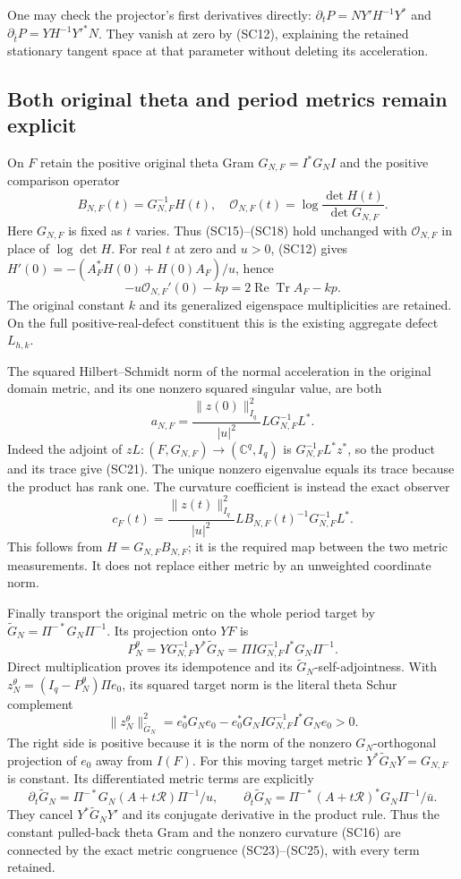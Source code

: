 \documentclass{article}
\begin{document}
One may check the projector's first derivatives directly:
$\partial_tP=NY'H^{-1}Y^*$ and
$\partial_{\bar t}P=YH^{-1}Y'^*N$.
They vanish at zero by (SC12), explaining the retained stationary
tangent space at that parameter without deleting its acceleration.

\subsection{Both original theta and period metrics remain explicit}

On $F$ retain the positive original theta Gram
$G_{N,F}=I^*G_NI$ and the positive comparison operator
\[
 B_{N,F}(t)=G_{N,F}^{-1}H(t),\quad
 \mathcal O_{N,F}(t)=\log\frac{\det H(t)}{\det G_{N,F}}.
 \tag{SC19}
\]
Here $G_{N,F}$ is fixed as $t$ varies.  Thus (SC15)--(SC18) hold
unchanged with $\mathcal O_{N,F}$ in place of $\log\det H$.
For real $t$ at zero and $u>0$, (SC12) gives
$H'(0)=-(A_F^*H(0)+H(0)A_F)/u$, hence
\[
 -u\mathcal O_{N,F}'(0)-kp
   =2\operatorname{Re}\operatorname{Tr}A_F-kp.
 \tag{SC20}
\]
The original constant $k$ and its generalized eigenspace multiplicities
are retained.  On the full positive-real-defect constituent this is
the existing aggregate defect $L_{h,k}$.

The squared Hilbert--Schmidt norm of the normal acceleration in the
original domain metric, and its one nonzero squared singular value,
are both
\[
 a_{N,F}=\frac{\|z(0)\|_{I_q}^2}{|u|^2}
              L G_{N,F}^{-1}L^*.
 \tag{SC21}
\]
Indeed the adjoint of $zL:(F,G_{N,F})\to(\mathbb C^q,I_q)$ is
$G_{N,F}^{-1}L^*z^*$, so the product and its trace give (SC21).
The unique nonzero eigenvalue equals its trace because the product
has rank one.  The curvature coefficient is instead the exact observer
\[
 c_F(t)=\frac{\|z(t)\|_{I_q}^2}{|u|^2}
       L B_{N,F}(t)^{-1}G_{N,F}^{-1}L^*.
 \tag{SC22}
\]
This follows from $H=G_{N,F}B_{N,F}$; it is the required map
between the two metric measurements.  It does not replace either
metric by an unweighted coordinate norm.

Finally transport the original metric on the whole period target by
$\widetilde G_N=\Pi^{-*}G_N\Pi^{-1}$.  Its projection onto $YF$ is
\[
 P_N^\theta
   =Y G_{N,F}^{-1}Y^*\widetilde G_N
   =\Pi I G_{N,F}^{-1}I^*G_N\Pi^{-1}.
 \tag{SC23}
\]
Direct multiplication proves its idempotence and its
$\widetilde G_N$-self-adjointness.  With
$z_N^\theta=(I_q-P_N^\theta)\Pi e_0$, its squared target norm is
the literal theta Schur complement
\[
 \|z_N^\theta\|_{\widetilde G_N}^2
   =e_0^*G_Ne_0-e_0^*G_NI G_{N,F}^{-1}I^*G_Ne_0>0.
 \tag{SC24}
\]
The right side is positive because it is the norm of the nonzero
$G_N$-orthogonal projection of $e_0$ away from $I(F)$.
For this moving target metric $Y^*\widetilde G_NY=G_{N,F}$ is
constant.  Its differentiated metric terms are explicitly
\[
 \partial_t\widetilde G_N
       =\Pi^{-*}G_N(A+t\mathcal R)\Pi^{-1}/u,
 \qquad
 \partial_{\bar t}\widetilde G_N
       =\Pi^{-*}(A+t\mathcal R)^*G_N\Pi^{-1}/\bar u.
 \tag{SC25}
\]
They cancel $Y^*\widetilde G_NY'$ and its conjugate derivative in
the product rule.  Thus the constant pulled-back theta Gram and the
nonzero curvature (SC16) are connected by the exact metric
congruence (SC23)--(SC25), with every term retained.
\end{document}
